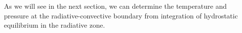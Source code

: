 \documentclass[apj]{emulateapj}
\begin{document}
As we will see in the next section, we can determine the temperature and pressure at the radiative-convective boundary from integration of hydrostatic equilibrium in the radiative zone. 






%
%
%
%
%





\end{document}
